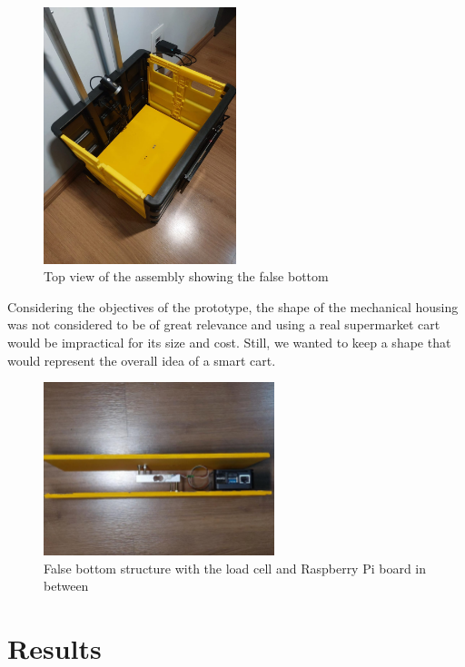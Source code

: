 \documentclass[openright]{normas-utf-tex} %
\begin{document}
\begin{figure}[H]
	\centering
	\includegraphics[width=0.5\textwidth]{./images/carttop.jpeg}
	\caption[Top view of the assembly showing the false bottom]{Top view of the assembly showing the false bottom}
\end{figure}

Considering the objectives of the prototype, the shape of the mechanical
housing was not considered to be of great relevance and using a real
supermarket cart would be impractical for its size and cost. Still, we wanted
to keep a shape that would represent the overall idea of a smart cart.

\begin{figure}[H]
	\centering
	\includegraphics[width=0.6\textwidth]{./images/cartbase2.jpeg}
	\caption[False bottom structure with the load cell and Raspberry Pi board in between]{False bottom structure with the load cell and Raspberry Pi board in between}
\end{figure}

\chapter{Results}
\end{document}
